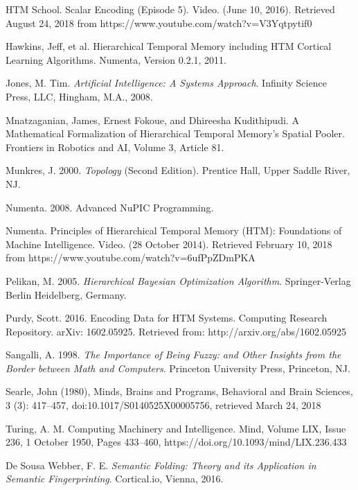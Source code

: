 \documentclass[fleqn,notitlepage,minimal]{article}
\begin{document}
\begin{thebibliography}{99}
		 HTM School. Scalar Encoding (Episode 5). Video. (June 10, 2016). Retrieved August 24, 2018 from  https://www.youtube.com/watch?v=V3Yqtpytif0
		
		 Hawkins, Jeff, et al. Hierarchical Temporal Memory including HTM Cortical Learning Algorithms. Numenta, Version 0.2.1, 2011. 
		
		 Jones, M. Tim. \emph{Artificial Intelligence: A Systems Approach}. Infinity Science Press, LLC, Hingham, M.A., 2008.
		
		 Mnatzaganian, James, Ernest Fokoue, and Dhireesha Kudithipudi. A Mathematical Formalization of Hierarchical Temporal Memory's Spatial Pooler. Frontiers in Robotics and AI, Volume 3, Article 81.
		
		 Munkres, J. 2000. \textit{Topology} (Second Edition). Prentice Hall, Upper Saddle River, NJ.
		
		 Numenta. 2008. Advanced NuPIC Programming. 
		
		 Numenta. Principles of Hierarchical Temporal Memory (HTM): Foundations of Machine Intelligence. Video. (28 October 2014). Retrieved February 10, 2018 from https://www.youtube.com/watch?v=6ufPpZDmPKA
		
		 Pelikan, M. 2005. \textit{Hierarchical Bayesian Optimization Algorithm}. Springer-Verlag Berlin Heidelberg, Germany.
		
		 Purdy, Scott. 2016. Encoding Data for HTM Systems. Computing Research Repository. arXiv: 1602.05925. Retrieved from: http://arxiv.org/abs/1602.05925
		
		 Sangalli, A. 1998. \textit{The Importance of Being Fuzzy: and Other Insights from the Border between Math and Computers}. Princeton University Press, Princeton, NJ.
		
		 Searle, John (1980), Minds, Brains and Programs, Behavioral and Brain Sciences, 3 (3): 417–457, doi:10.1017/S0140525X00005756, retrieved March 24, 2018
		
		 Turing, A. M. Computing Machinery and Intelligence. Mind, Volume LIX, Issue 236, 1 October 1950, Pages 433–460, https://doi.org/10.1093/mind/LIX.236.433
		
		 De Sousa Webber, F. E. \textit{Semantic Folding: Theory and its Application in Semantic Fingerprinting}. Cortical.io, Vienna, 2016.
		
		
	\end{thebibliography}
	
\end{document}
